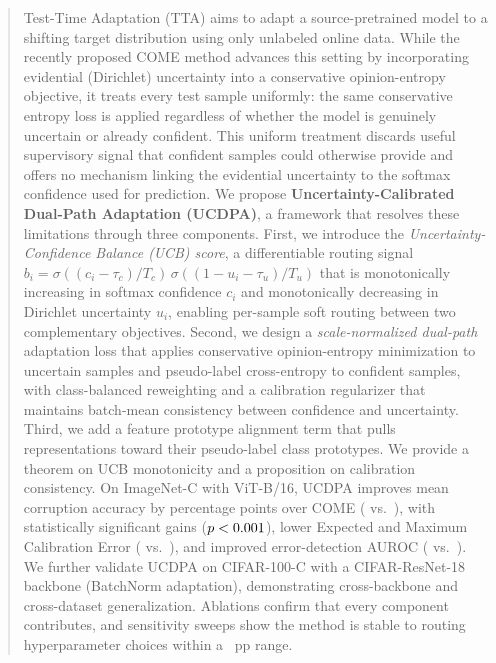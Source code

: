 \begin{abstract}
Test-Time Adaptation (TTA) aims to adapt a source-pretrained model to a shifting target distribution using only unlabeled online data. While the recently proposed COME method advances this setting by incorporating evidential (Dirichlet) uncertainty into a conservative opinion-entropy objective, it treats every test sample uniformly: the same conservative entropy loss is applied regardless of whether the model is genuinely uncertain or already confident. This uniform treatment discards useful supervisory signal that confident samples could otherwise provide and offers no mechanism linking the evidential uncertainty to the softmax confidence used for prediction. We propose \textbf{Uncertainty-Calibrated Dual-Path Adaptation (UCDPA)}, a framework that resolves these limitations through three components. First, we introduce the \emph{Uncertainty-Confidence Balance (UCB) score}, a differentiable routing signal $b_i=\sigma((c_i-\tau_c)/T_c)\,\sigma((1-u_i-\tau_u)/T_u)$ that is monotonically increasing in softmax confidence $c_i$ and monotonically decreasing in Dirichlet uncertainty $u_i$, enabling per-sample soft routing between two complementary objectives. Second, we design a \emph{scale-normalized dual-path} adaptation loss that applies conservative opinion-entropy minimization to uncertain samples and pseudo-label cross-entropy to confident samples, with class-balanced reweighting and a calibration regularizer that maintains batch-mean consistency between confidence and uncertainty. Third, we add a feature prototype alignment term that pulls representations toward their pseudo-label class prototypes. We provide a theorem on UCB monotonicity and a proposition on calibration consistency. On ImageNet-C with ViT-B/16, UCDPA improves mean corruption accuracy by \ucdpadelta{} percentage points over COME (\ucdpaacc{} vs.\ \comeacc{}), with statistically significant gains ($p<\pvalue{}$), lower Expected and Maximum Calibration Error (\ucdpaece{} vs.\ \comeece{}), and improved error-detection AUROC (\ucdpaauroc{} vs.\ \comeauroc{}). We further validate UCDPA on CIFAR-100-C with a CIFAR-ResNet-18 backbone (BatchNorm adaptation), demonstrating cross-backbone and cross-dataset generalization. Ablations confirm that every component contributes, and sensitivity sweeps show the method is stable to routing hyperparameter choices within a \sensRange{}~pp range.
\end{abstract}

